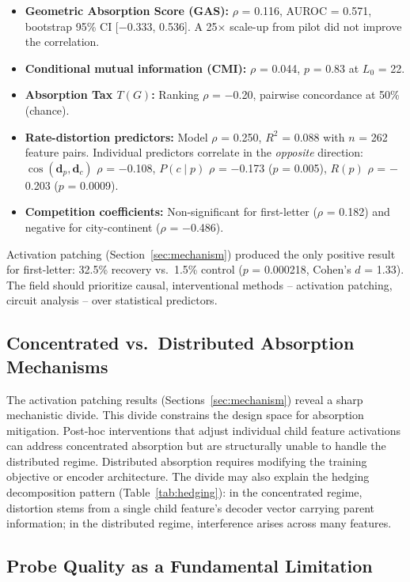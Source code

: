 \documentclass{article}
\begin{document}
\begin{itemize}
\item \textbf{Geometric Absorption Score (GAS):} $\rho$ = 0.116, AUROC = 0.571, bootstrap 95\% CI [$-$0.333, 0.536]. A 25$\times$ scale-up from pilot did not improve the correlation.
\item \textbf{Conditional mutual information (CMI):} $\rho$ = 0.044, $p$ = 0.83 at $L_0$ = 22.
\item \textbf{Absorption Tax $T(G)$:} Ranking $\rho$ = $-$0.20, pairwise concordance at 50\% (chance).
\item \textbf{Rate-distortion predictors:} Model $\rho$ = 0.250, $R^2$ = 0.088 with $n$ = 262 feature pairs. Individual predictors correlate in the \emph{opposite} direction: $\cos(\mathbf{d}_p, \mathbf{d}_c)$ $\rho$ = $-$0.108, $P(c \mid p)$ $\rho$ = $-$0.173 ($p$ = 0.005), $R(p)$ $\rho$ = $-$0.203 ($p$ = 0.0009).
\item \textbf{Competition coefficients:} Non-significant for first-letter ($\rho$ = 0.182) and negative for city-continent ($\rho$ = $-$0.486).
\end{itemize}

Activation patching (Section~\ref{sec:mechanism}) produced the only positive result for first-letter: 32.5\% recovery vs.\ 1.5\% control ($p$ = 0.000218, Cohen's $d$ = 1.33). The field should prioritize causal, interventional methods -- activation patching, circuit analysis \citep{conmy2023automated} -- over statistical predictors.

\subsection{Concentrated vs.\ Distributed Absorption Mechanisms}

The activation patching results (Sections~\ref{sec:mechanism}) reveal a sharp mechanistic divide. This divide constrains the design space for absorption mitigation. Post-hoc interventions that adjust individual child feature activations can address concentrated absorption but are structurally unable to handle the distributed regime. Distributed absorption requires modifying the training objective or encoder architecture. The divide may also explain the hedging decomposition pattern (Table~\ref{tab:hedging}): in the concentrated regime, distortion stems from a single child feature's decoder vector carrying parent information; in the distributed regime, interference arises across many features.

\subsection{Probe Quality as a Fundamental Limitation}
\end{document}
